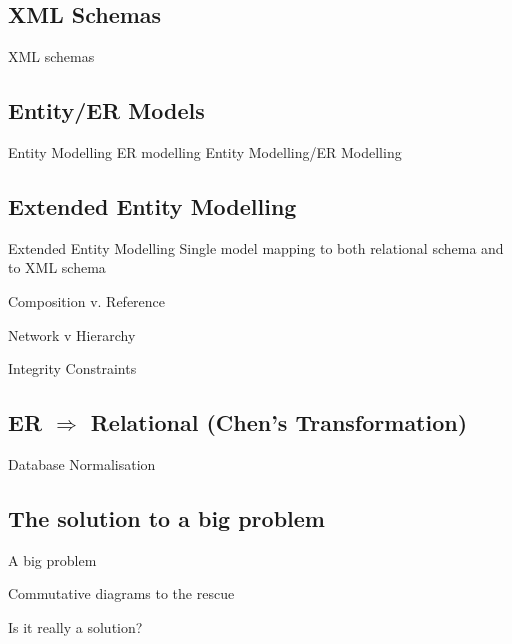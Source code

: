 \documentclass{beamer}
\begin{document}
\subsection{XML Schemas}
\begin{frame}{XML schemas}
\end{frame}

\subsection{Entity/ER Models}
\begin{frame}{Entity Modelling ER modelling}
Entity Modelling/ER Modelling
\end{frame}
\subsection{Extended Entity Modelling}

\begin{frame}{Extended Entity Modelling}
Single model mapping to both relational schema and to XML schema
\end{frame}
\begin{frame}{Composition v. Reference}
\end{frame}
\begin{frame}{Network v Hierarchy}
\end{frame}
\begin{frame}{Integrity Constraints}
\end{frame}
\subsection{ER $\Longrightarrow$ Relational (Chen's Transformation)}
\begin{frame}
\end{frame}
\begin{frame}{Database Normalisation}
\end{frame}

\subsection{The solution to a big problem}
\begin{frame}{A big problem}
\end{frame}
\begin{frame}{Commutative diagrams to the rescue}
\end{frame}
\begin{frame}{Is it really a solution?}
\end{frame}
\end{document}
